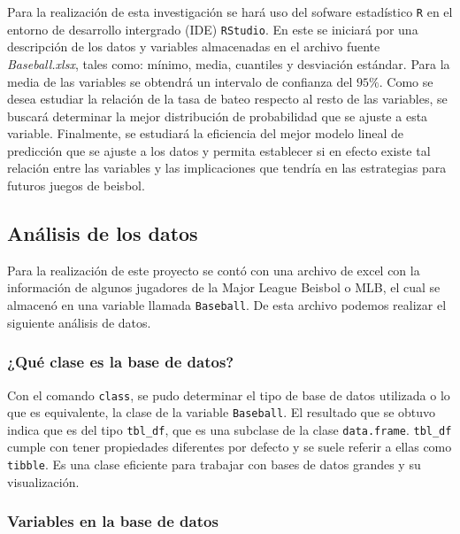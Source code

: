\documentclass{staprojteamusb}
\begin{document}
 Para la realización de esta investigación se hará uso del sofware estadístico \texttt{R} en el entorno de desarrollo intergrado (IDE) \texttt{RStudio}. En este se iniciará por una descripción de los datos y variables almacenadas en el archivo fuente \emph{Baseball.xlsx}, tales como: mínimo, media, cuantiles y desviación estándar. Para la media de las variables se obtendrá un intervalo de confianza del \(95\%\). Como se desea estudiar la relación de la tasa de bateo respecto al resto de las variables, se buscará determinar la mejor distribución de probabilidad que se ajuste a esta variable. Finalmente, se estudiará la eficiencia del mejor modelo lineal de predicción que se ajuste a los datos y permita establecer si en efecto existe tal relación entre las variables y las implicaciones que tendría en las estrategias para futuros juegos de beisbol.

 \hypertarget{anuxe1lisis-de-los-datos}{%
 \subsection{Análisis de los datos}\label{anuxe1lisis-de-los-datos}}

 Para la realización de este proyecto se contó con una archivo de excel con la información de algunos jugadores de la Major League Beisbol o MLB, el cual se almacenó en una variable llamada \texttt{Baseball}. De esta archivo podemos realizar el siguiente análisis de datos.

 \hypertarget{quuxe9-clase-es-la-base-de-datos}{%
 \subsubsection{¿Qué clase es la base de datos?}\label{quuxe9-clase-es-la-base-de-datos}}

 Con el comando \texttt{class}, se pudo determinar el tipo de base de datos utilizada o lo que es equivalente, la clase de la variable \texttt{Baseball}. El resultado que se obtuvo indica que es del tipo \texttt{tbl\_df}, que es una subclase de la clase \texttt{data.frame}. \texttt{tbl\_df} cumple con tener propiedades diferentes por defecto y se suele referir a ellas como \texttt{tibble}. Es una clase eficiente para trabajar con bases de datos grandes y su visualización.

 \hypertarget{variables-en-la-base-de-datos}{%
 \subsubsection{Variables en la base de datos}\label{variables-en-la-base-de-datos}}
\end{document}
